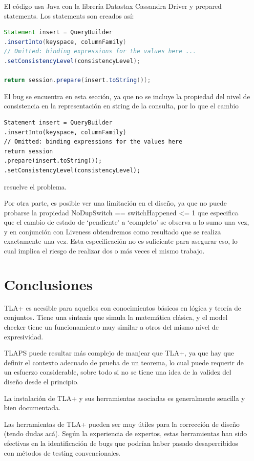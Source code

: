 \documentclass[runningheads]{llncs}
\begin{document}
El código usa Java con la librería Datastax Cassandra Driver y prepared statements. Los statements son creados así:
\begin{lstlisting}[language=Java]
Statement insert = QueryBuilder
.insertInto(keyspace, columnFamily)
// Omitted: binding expressions for the values here ...
.setConsistencyLevel(consistencyLevel);

return session.prepare(insert.toString());
\end{lstlisting}

El bug se encuentra en esta sección, ya que no se incluye la propiedad del nivel de consistencia en la representación en string de la consulta, por lo que el cambio
\begin{lstlisting}
Statement insert = QueryBuilder
.insertInto(keyspace, columnFamily)
// Omitted: binding expressions for the values here
return session
.prepare(insert.toString());
.setConsistencyLevel(consistencyLevel);
\end{lstlisting}

resuelve el problema.

Por otra parte, es posible ver una limitación en el diseño, ya que no puede probarse la propiedad 
NoDupSwitch == switchHappened <= 1
que especifica que el cambio de estado de ‘pendiente’ a ‘completo’ se observa a lo sumo una vez, y en conjunción con Liveness obtendremos como resultado que se realiza exactamente una vez. Esta especificación no es suficiente para asegurar eso, lo cual implica el riesgo de realizar dos o más veces el mismo trabajo.


\section{Conclusiones}

TLA+ es acesible para aquellos con conocimientos básicos en lógica y teoría de conjuntos. Tiene una sintaxis que simula la matemática clásica, y el model checker tiene un funcionamiento muy similar a otros del mismo nivel de expresividad.

TLAPS puede resultar más complejo de manjear que TLA+, ya que hay que definir el contexto adecuado de prueba de un teorema, lo cual puede requerir de un esfuerzo considerable, sobre todo si no se tiene una idea de la validez del diseño desde el principio. 

La instalación de TLA+ y sus herramientas asociadas es generalmente sencilla y bien documentada.

Las herramientas de TLA+ pueden ser muy útiles para la corrección de diseño (tendo dudas acá). Según la experiencia de expertos, estas herramientas han sido efectivas en la identificación de bugs que podrían haber pasado desapercibidos con métodos de testing convencionales.
\end{document}
